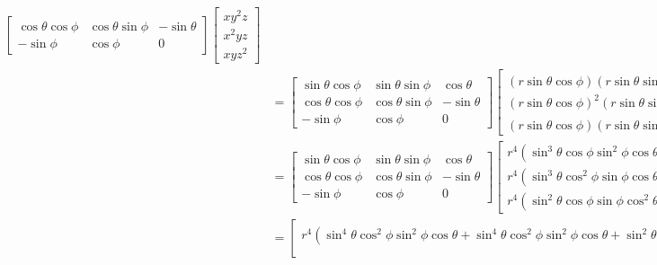 \begin{problema}
\begin{enumerate}
\begin{sol}
\begin{itemize}
\begin{align*}
\begin{bmatrix}
                        \cos \theta \cos\phi & \cos\theta \sin\phi & -\sin\theta\\
                        -\sin \phi & \cos\phi & 0
                    \end{bmatrix}\begin{bmatrix}
                        xy^2z\\
                        x^2yz\\
                        xyz^2
                    \end{bmatrix}\\
                    &= \begin{bmatrix}
                        \sin\theta\cos\phi & \sin\theta\sin\phi & \cos\theta\\
                        \cos \theta \cos\phi & \cos\theta \sin\phi & -\sin\theta\\
                        -\sin \phi & \cos\phi & 0
                    \end{bmatrix}\begin{bmatrix}
                        (r\sin\theta\cos\phi)(r\sin\theta\sin\phi)^2(r\cos\theta)\\
                        (r\sin\theta\cos\phi)^2(r\sin\theta\sin\phi)(r\cos\theta)\\
                        (r\sin\theta\cos\phi)(r\sin\theta\sin\phi)(r\cos\theta)^2
                    \end{bmatrix}\\
                    &= \begin{bmatrix}
                        \sin\theta\cos\phi & \sin\theta\sin\phi & \cos\theta\\
                        \cos \theta \cos\phi & \cos\theta \sin\phi & -\sin\theta\\
                        -\sin \phi & \cos\phi & 0
                    \end{bmatrix}\begin{bmatrix}
                        r^4(\sin^3\theta\cos\phi\sin^2\phi\cos\theta)\\
                        r^4(\sin^3\theta\cos^2\phi\sin\phi\cos\theta)\\
                        r^4(\sin^2\theta\cos\phi\sin\phi\cos^2\theta)
                    \end{bmatrix}\\
                    &= \begin{bmatrix}
                        r^4\left(\sin^4\theta\cos^2\phi\sin^2\phi\cos\theta + \sin^4\theta\cos^2\phi\sin^2\phi\cos\theta+ \sin^2\theta\cos\phi\sin\phi\cos^3\theta\right)\\

\end{bmatrix}
\end{align*}
\end{itemize}
\end{sol}
\end{enumerate}
\end{problema}
